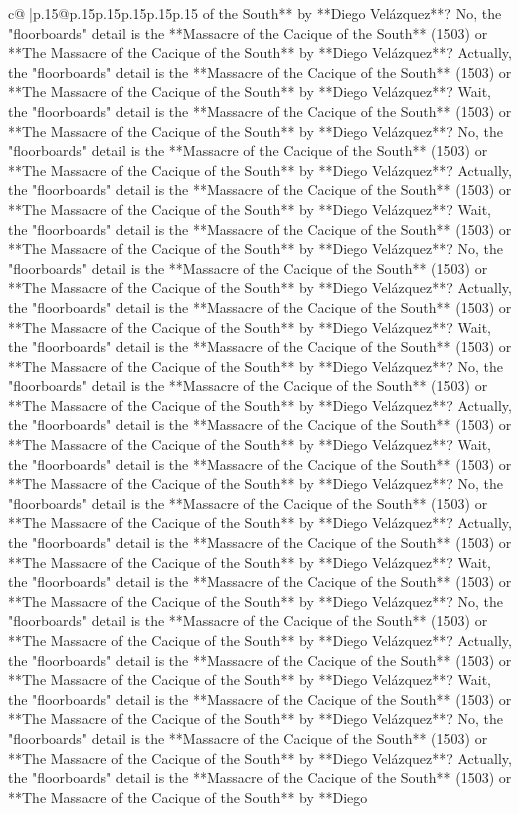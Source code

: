 \documentclass{article}
\begin{document}
{\begin{supertabular}{c@{$\;$}|p{.15\linewidth}@{}p{.15\linewidth}p{.15\linewidth}p{.15\linewidth}p{.15\linewidth}p{.15\linewidth}}
{{{of the South** by **Diego Velázquez**? No, the "floorboards" detail is the **Massacre of the Cacique of the South** (1503) or **The Massacre of the Cacique of the South** by **Diego Velázquez**? Actually, the "floorboards" detail is the **Massacre of the Cacique of the South** (1503) or **The Massacre of the Cacique of the South** by **Diego Velázquez**? Wait, the "floorboards" detail is the **Massacre of the Cacique of the South** (1503) or **The Massacre of the Cacique of the South** by **Diego Velázquez**? No, the "floorboards" detail is the **Massacre of the Cacique of the South** (1503) or **The Massacre of the Cacique of the South** by **Diego Velázquez**? Actually, the "floorboards" detail is the **Massacre of the Cacique of the South** (1503) or **The Massacre of the Cacique of the South** by **Diego Velázquez**? Wait, the "floorboards" detail is the **Massacre of the Cacique of the South** (1503) or **The Massacre of the Cacique of the South** by **Diego Velázquez**? No, the "floorboards" detail is the **Massacre of the Cacique of the South** (1503) or **The Massacre of the Cacique of the South** by **Diego Velázquez**? Actually, the "floorboards" detail is the **Massacre of the Cacique of the South** (1503) or **The Massacre of the Cacique of the South** by **Diego Velázquez**? Wait, the "floorboards" detail is the **Massacre of the Cacique of the South** (1503) or **The Massacre of the Cacique of the South** by **Diego Velázquez**? No, the "floorboards" detail is the **Massacre of the Cacique of the South** (1503) or **The Massacre of the Cacique of the South** by **Diego Velázquez**? Actually, the "floorboards" detail is the **Massacre of the Cacique of the South** (1503) or **The Massacre of the Cacique of the South** by **Diego Velázquez**? Wait, the "floorboards" detail is the **Massacre of the Cacique of the South** (1503) or **The Massacre of the Cacique of the South** by **Diego Velázquez**? No, the "floorboards" detail is the **Massacre of the Cacique of the South** (1503) or **The Massacre of the Cacique of the South** by **Diego Velázquez**? Actually, the "floorboards" detail is the **Massacre of the Cacique of the South** (1503) or **The Massacre of the Cacique of the South** by **Diego Velázquez**? Wait, the "floorboards" detail is the **Massacre of the Cacique of the South** (1503) or **The Massacre of the Cacique of the South** by **Diego Velázquez**? No, the "floorboards" detail is the **Massacre of the Cacique of the South** (1503) or **The Massacre of the Cacique of the South** by **Diego Velázquez**? Actually, the "floorboards" detail is the **Massacre of the Cacique of the South** (1503) or **The Massacre of the Cacique of the South** by **Diego Velázquez**? Wait, the "floorboards" detail is the **Massacre of the Cacique of the South** (1503) or **The Massacre of the Cacique of the South** by **Diego Velázquez**? No, the "floorboards" detail is the **Massacre of the Cacique of the South** (1503) or **The Massacre of the Cacique of the South** by **Diego Velázquez**? Actually, the "floorboards" detail is the **Massacre of the Cacique of the South** (1503) or **The Massacre of the Cacique of the South** by **Diego }}}
\end{supertabular}}
\end{document}

